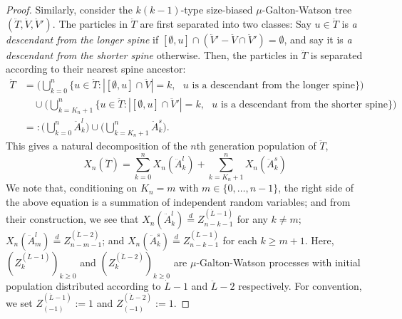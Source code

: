 \documentclass[12pt,a4paper]{amsart}
\numberwithin{equation}{section}
\begin{document}
\begin{proof}
	Similarly, consider the $k(k-1)$-type size-biased $\mu$-Galton-Watson tree $(\ddot T,\ddot V,\ddot V')$.
	The particles in $\ddot T$ are first separated into two classes: Say $u \in \ddot T$ is \emph{a descendant from the longer spine} if $[\emptyset , u] \cap (\ddot V' - \ddot V \cap \ddot V') = \emptyset$, and say it is \emph{a descendant from the shorter spine} otherwise.
	Then, the particles in $\ddot T$ is separated according to their nearest spine ancestor:
\begin{equation*}\begin{split}
	\ddot T
	&=\Big( \bigcup_{k=0}^n \{u\in\ddot T: | [\emptyset, u]\cap \ddot V | = k, \text{ $u$ is a descendant from the longer spine}\} \Big)
	\\&\quad \cup \Big( \bigcup_{k= K_n+1}^n \{u\in\ddot T: | [\emptyset, u]\cap \ddot V' | = k, \text{ $u$ is a descendant from the shorter spine}\}  \Big)
	\\&=: 	\Big ( \bigcup_{k=0}^n \ddot A^l_k\Big)  \cup \Big( \bigcup_{k=K_n+1}^n \ddot A^s_k \Big).
\end{split}\end{equation*}
	This gives a natural decomposition of the $n$th generation population of $\ddot T$,
\begin{equation}\label{eq:rawtwospinedecomposition}
		X_n(\ddot T)
	=
		\sum_{k=0}^nX_n(\ddot A^l_k) + \sum_{k=K_n + 1}^n X_n(\ddot A^s_k)
\end{equation}
	We note that, conditioning on $K_n = m$ with $m\in\{0,\dots,n-1\}$, the right side of the above equation is a summation of independent random variables; and from their construction, we see that
	$X_n(\ddot A^l_k) \overset{d}{=} Z^{(\dot L - 1)}_{n-k-1}$ for any $k \neq m$;
	$X_n(\ddot A^l_m) \overset{d}{=} Z^{(\ddot L - 2)}_{n-m-1}$;
	and $X_n(\ddot A^s_k) \overset{d}{=} Z^{(\dot L - 1)}_{n-k-1}$ for each $k \geq m+1$.
	Here, $(Z^{(\dot L - 1)}_k)_{k\ge 0}$ and $(Z^{(\ddot L - 2)}_k)_{k\ge 0}$ are $\mu$-Galton-Watson processes with initial population distributed according to $\dot L-1$ and $\ddot L-2$ respectively.
	For convention, we set $Z^{(\dot L - 1)}_{(-1)}:= 1$ and $Z^{(\ddot L - 2)}_{(-1)}:= 1$.


\end{proof}
\end{document}
